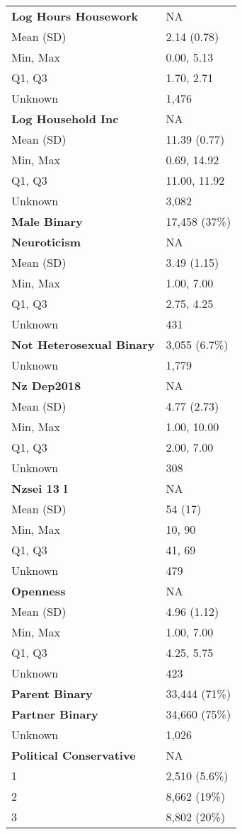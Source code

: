 \documentclass[
  single column]{article}
\begin{document}
\begin{longtable}[]{@{}ll@{}}
\textbf{Log Hours Housework} & NA \\
Mean (SD) & 2.14 (0.78) \\
Min, Max & 0.00, 5.13 \\
Q1, Q3 & 1.70, 2.71 \\
Unknown & 1,476 \\
\textbf{Log Household Inc} & NA \\
Mean (SD) & 11.39 (0.77) \\
Min, Max & 0.69, 14.92 \\
Q1, Q3 & 11.00, 11.92 \\
Unknown & 3,082 \\
\textbf{Male Binary} & 17,458 (37\%) \\
\textbf{Neuroticism} & NA \\
Mean (SD) & 3.49 (1.15) \\
Min, Max & 1.00, 7.00 \\
Q1, Q3 & 2.75, 4.25 \\
Unknown & 431 \\
\textbf{Not Heterosexual Binary} & 3,055 (6.7\%) \\
Unknown & 1,779 \\
\textbf{Nz Dep2018} & NA \\
Mean (SD) & 4.77 (2.73) \\
Min, Max & 1.00, 10.00 \\
Q1, Q3 & 2.00, 7.00 \\
Unknown & 308 \\
\textbf{Nzsei 13 l} & NA \\
Mean (SD) & 54 (17) \\
Min, Max & 10, 90 \\
Q1, Q3 & 41, 69 \\
Unknown & 479 \\
\textbf{Openness} & NA \\
Mean (SD) & 4.96 (1.12) \\
Min, Max & 1.00, 7.00 \\
Q1, Q3 & 4.25, 5.75 \\
Unknown & 423 \\
\textbf{Parent Binary} & 33,444 (71\%) \\
\textbf{Partner Binary} & 34,660 (75\%) \\
Unknown & 1,026 \\
\textbf{Political Conservative} & NA \\
1 & 2,510 (5.6\%) \\
2 & 8,662 (19\%) \\
3 & 8,802 (20\%) \\

\end{longtable}
\end{document}
